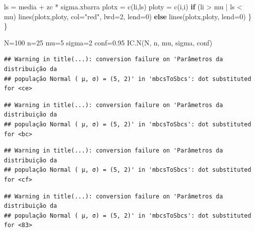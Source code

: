 \documentclass[
]{book}
\newenvironment{Shaded}{\begin{snugshade}}{\end{snugshade}}
\newcommand{\AttributeTok}[1]{\textcolor[rgb]{0.77,0.63,0.00}{#1}}
\newcommand{\ControlFlowTok}[1]{\textcolor[rgb]{0.13,0.29,0.53}{\textbf{#1}}}
\newcommand{\DecValTok}[1]{\textcolor[rgb]{0.00,0.00,0.81}{#1}}
\newcommand{\FloatTok}[1]{\textcolor[rgb]{0.00,0.00,0.81}{#1}}
\newcommand{\FunctionTok}[1]{\textcolor[rgb]{0.00,0.00,0.00}{#1}}
\newcommand{\NormalTok}[1]{#1}
\newcommand{\OtherTok}[1]{\textcolor[rgb]{0.56,0.35,0.01}{#1}}
\newcommand{\SpecialCharTok}[1]{\textcolor[rgb]{0.00,0.00,0.00}{#1}}
\newcommand{\StringTok}[1]{\textcolor[rgb]{0.31,0.60,0.02}{#1}}
\begin{document}
\begin{Shaded}
\begin{Highlighting}[]
\NormalTok{  ls }\OtherTok{=}\NormalTok{ media }\SpecialCharTok{+}\NormalTok{ zc }\SpecialCharTok{*}\NormalTok{ sigma.xbarra}
\NormalTok{  plotx }\OtherTok{=} \FunctionTok{c}\NormalTok{(li,ls)}
\NormalTok{  ploty }\OtherTok{=} \FunctionTok{c}\NormalTok{(i,i)}
  \ControlFlowTok{if}\NormalTok{ (li }\SpecialCharTok{\textgreater{}}\NormalTok{ mu }\SpecialCharTok{|}\NormalTok{ ls }\SpecialCharTok{\textless{}}\NormalTok{ mu) }\FunctionTok{lines}\NormalTok{(plotx,ploty, }\AttributeTok{col=}\StringTok{"red"}\NormalTok{, }\AttributeTok{lwd=}\DecValTok{2}\NormalTok{, }\AttributeTok{lend=}\DecValTok{0}\NormalTok{)}
  \ControlFlowTok{else} \FunctionTok{lines}\NormalTok{(plotx,ploty, }\AttributeTok{lend=}\DecValTok{0}\NormalTok{)}
\NormalTok{\} \}}
\end{Highlighting}
\end{Shaded}

\hfill\break

\begin{Shaded}
\begin{Highlighting}[]
\NormalTok{N}\OtherTok{=}\DecValTok{100}
\NormalTok{n}\OtherTok{=}\DecValTok{25}
\NormalTok{mu}\OtherTok{=}\DecValTok{5}
\NormalTok{sigma}\OtherTok{=}\DecValTok{2}
\NormalTok{conf}\OtherTok{=}\FloatTok{0.95}
\FunctionTok{IC.N}\NormalTok{(N, n, mu, sigma, conf)}
\end{Highlighting}
\end{Shaded}

\begin{verbatim}
## Warning in title(...): conversion failure on 'Parâmetros da distribuição da
## população Normal ( μ, σ) = (5, 2)' in 'mbcsToSbcs': dot substituted for <ce>
\end{verbatim}

\begin{verbatim}
## Warning in title(...): conversion failure on 'Parâmetros da distribuição da
## população Normal ( μ, σ) = (5, 2)' in 'mbcsToSbcs': dot substituted for <bc>
\end{verbatim}

\begin{verbatim}
## Warning in title(...): conversion failure on 'Parâmetros da distribuição da
## população Normal ( μ, σ) = (5, 2)' in 'mbcsToSbcs': dot substituted for <cf>
\end{verbatim}

\begin{verbatim}
## Warning in title(...): conversion failure on 'Parâmetros da distribuição da
## população Normal ( μ, σ) = (5, 2)' in 'mbcsToSbcs': dot substituted for <83>
\end{verbatim}
\end{document}
